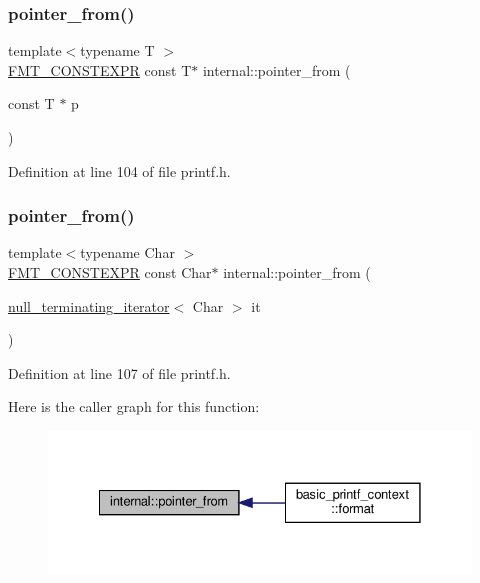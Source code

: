 \subsubsection{\texorpdfstring{pointer\+\_\+from()}{pointer\_from()}\hspace{0.1cm}{\footnotesize\ttfamily [1/3]}}
{\footnotesize\ttfamily template$<$typename T $>$ \\
\hyperlink{core_8h_a69201cb276383873487bf68b4ef8b4cd}{F\+M\+T\+\_\+\+C\+O\+N\+S\+T\+E\+X\+PR} const T$\ast$ internal\+::pointer\+\_\+from (\begin{DoxyParamCaption}\item[{const T $\ast$}]{p }\end{DoxyParamCaption})}



Definition at line 104 of file printf.\+h.

\mbox{\label{namespaceinternal_af2847d65bcda093de54229cfc396c072}} 
\subsubsection{\texorpdfstring{pointer\+\_\+from()}{pointer\_from()}\hspace{0.1cm}{\footnotesize\ttfamily [2/3]}}
{\footnotesize\ttfamily template$<$typename Char $>$ \\
\hyperlink{core_8h_a69201cb276383873487bf68b4ef8b4cd}{F\+M\+T\+\_\+\+C\+O\+N\+S\+T\+E\+X\+PR} const Char$\ast$ internal\+::pointer\+\_\+from (\begin{DoxyParamCaption}\item[{\hyperlink{classinternal_1_1null__terminating__iterator}{null\+\_\+terminating\+\_\+iterator}$<$ Char $>$}]{it }\end{DoxyParamCaption})}



Definition at line 107 of file printf.\+h.

Here is the caller graph for this function\+:
\nopagebreak
\begin{figure}[H]
\begin{center}
\leavevmode
\includegraphics[width=328pt]{namespaceinternal_af2847d65bcda093de54229cfc396c072_icgraph}
\end{center}
\end{figure}
\mbox{\label{namespaceinternal_a1c1f62847a38000abb38914d5a42ae9f}} 
